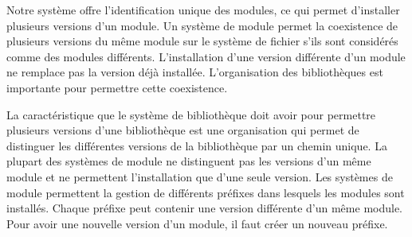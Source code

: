 Notre système offre l'identification unique des modules, ce qui permet
d'installer plusieurs versions d'un module.  Un système de module permet la
coexistence de plusieurs versions du même module sur le système de fichier
s'ils sont considérés comme des modules différents.  L'installation d'une
version différente d'un module ne remplace pas la version déjà installée.
L'organisation des bibliothèques est importante pour permettre cette
coexistence.

La caractéristique que le système de bibliothèque doit avoir pour permettre
plusieurs versions d'une bibliothèque est une organisation qui permet de
distinguer les différentes versions de la bibliothèque par un chemin unique.
La plupart des systèmes de module ne distinguent pas les versions d'un même
module et ne permettent l'installation que d'une seule version. Les systèmes de
module permettent la gestion de différents préfixes dans lesquels les modules sont
installés. Chaque préfixe peut contenir une version différente d'un même
module. Pour avoir une nouvelle version d'un module, il faut créer un nouveau
préfixe.




